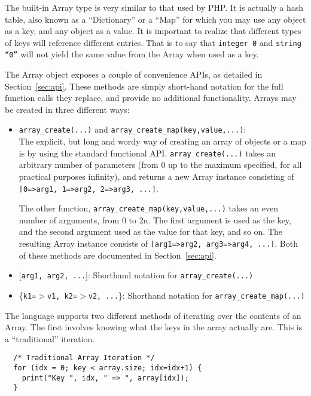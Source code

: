 The built-in Array type is very similar to that used by PHP. It is actually
a hash table, also known as a ``Dictionary'' or a ``Map'' for which you may use
any object as a key, and any object as a value. It is important to realize that
different types of keys will reference different entries. That is to say that
{\tt integer 0} and {\tt string ``0''} will not yield the same value from the
Array when used as a key.

The Array object exposes a couple of convenience APIs, as detailed in Section~\ref{sec:api}.
These methods are simply short-hand notation for the full function calls they
replace, and provide no additional functionality. Arrays may be created in
three different ways:

\begin{itemize}
\item {\tt array\_create(...)} and {\tt array\_create\_map(key,value,...)}:\\
  The explicit, but long and wordy way of creating an array of objects or a map is by using
  the standard functional API. {\tt array\_create(...)} takes an arbitrary number
  of parameters (from 0 up to the maximum specified, for all practical purposes infinity),
  and returns a new Array instance consisting of {\tt [0=>arg1, 1=>arg2, 2=>arg3, ...]}.
  
  The other function, {\tt array\_create\_map(key,value,...)} takes an even number of
  arguments, from 0 to 2n. The first argument is used as the key, and the second argument
  used as the value for that key, and so on. The resulting Array instance consists
  of {\tt [arg1=>arg2, arg3=>arg4, ...]}. Both of these methods are documented in Section~\ref{sec:api}.
\item {\tt $[$arg1, arg2, ...$]$}: Shorthand notation for {\tt array\_create(...)}
\item \{{\tt k1=$>$v1, k2=$>$v2, ...}\}: Shorthand notation for {\tt array\_create\_map(...)}
\end{itemize}

The \ModLang language supports two different methods of iterating over the 
contents of an Array. The first involves knowing what the keys in the array
actually are. This is a ``traditional'' iteration.

\lstset{language=LQX}
\begin{lstlisting}  
  /* Traditional Array Iteration */
  for (idx = 0; key < array.size; idx=idx+1) {
    print("Key ", idx, " => ", array[idx]);
  } 
\end{lstlisting}

